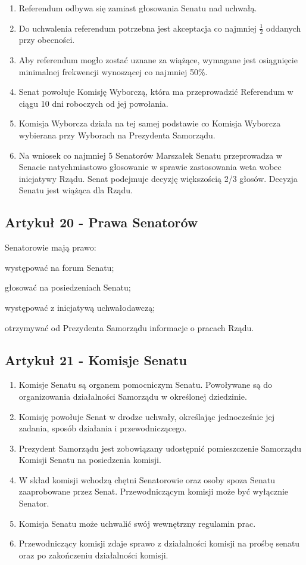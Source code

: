 \documentclass[14pt]{article}
\newcounter{podpunktyCounter}
\newenvironment{podpunkty}
{%
	\begin{list}{\arabic{podpunktyCounter})}%
		{%
			\usecounter{podpunktyCounter}
			\setlength{\itemsep}{1pt}
			\setlength{\topsep}{3pt}
		}%
	}%
	{\end{list}}
\newenvironment{ustepy}{%
	\begin{enumerate}[leftmargin=1.5em, itemindent=1pt, labelwidth=1em, itemsep=5pt]
	}{%
	\end{enumerate}
}
\begin{document}
\begin{ustepy}
	\item Referendum odbywa się zamiast głosowania Senatu nad uchwałą.
	\item Do uchwalenia referendum potrzebna jest akceptacja co najmniej \(\frac{1}{2}\) oddanych przy obecności.
	\item Aby referendum mogło zostać uznane za wiążące, wymagane jest osiągnięcie minimalnej frekwencji wynoszącej co najmniej 50\%.
	\item Senat powołuje Komisję Wyborczą, która ma przeprowadzić Referendum w ciągu 10 dni roboczych od jej powołania.
	\item Komisja Wyborcza działa na tej samej podstawie co Komisja Wyborcza wybierana przy Wyborach na Prezydenta Samorządu.
	\item Na wniosek co najmniej 5 Senatorów Marszałek Senatu przeprowadza w Senacie natychmiastowo głosowanie w sprawie zastosowania weta wobec inicjatywy Rządu. Senat podejmuje decyzję większością 2/3 głosów. Decyzja Senatu jest wiążąca dla Rządu. 
\end{ustepy}
\subsection*{Artykuł 20 - Prawa Senatorów}
Senatorowie mają prawo:
\begin{podpunkty}
	\item występować na forum Senatu;
	\item głosować na posiedzeniach Senatu;
	\item występować z inicjatywą uchwałodawczą;
	\item otrzymywać od Prezydenta Samorządu informacje o pracach Rządu.
\end{podpunkty}

\subsection*{Artykuł 21 - Komisje Senatu}
\begin{ustepy}
	\item Komisje Senatu są organem pomocniczym Senatu. Powoływane są do organizowania działalności Samorządu w określonej dziedzinie.
	\item Komisję powołuje Senat w drodze uchwały, określając jednocześnie jej zadania, sposób działania i przewodniczącego.
	\item Prezydent Samorządu jest zobowiązany udostępnić pomieszczenie Samorządu Komisji Senatu na posiedzenia komisji.
	\item W skład komisji wchodzą chętni Senatorowie oraz osoby spoza Senatu zaaprobowane przez Senat. Przewodniczącym komisji może być wyłącznie Senator.
	\item Komisja Senatu może uchwalić swój wewnętrzny regulamin prac.
	\item Przewodniczący komisji zdaje sprawo z działalności komisji na prośbę senatu oraz po zakończeniu działalności komisji.
\end{ustepy}
\newpage
\end{document}
